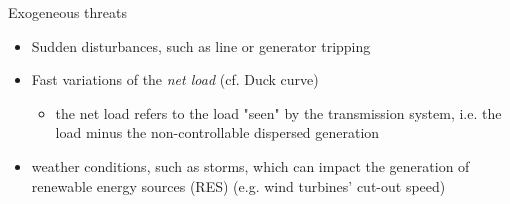 \begin{frame}{Exogeneous threats}
  \begin{itemize}
      \item Sudden disturbances, such as line or generator tripping
      \item Fast variations of the \textit{net load} (cf. Duck curve)
      \begin{itemize}
        \item the net load refers to the load "seen" by the transmission system, i.e. the load minus the non-controllable dispersed generation
      \end{itemize}
      \item weather conditions, such as storms, which can impact the generation of renewable energy sources (RES) (e.g. wind turbines' cut-out speed)
  \end{itemize}
\end{frame}


